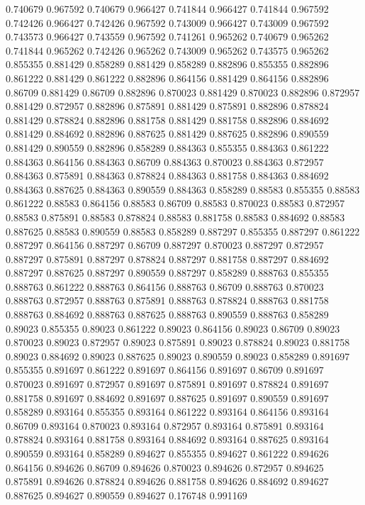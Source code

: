 0.740679 0.967592
0.740679 0.966427
0.741844 0.966427
0.741844 0.967592
0.742426 0.966427
0.742426 0.967592
0.743009 0.966427
0.743009 0.967592
0.743573 0.966427
0.743559 0.967592
0.741261 0.965262
0.740679 0.965262
0.741844 0.965262
0.742426 0.965262
0.743009 0.965262
0.743575 0.965262
0.855355 0.881429
0.858289 0.881429
0.858289 0.882896
0.855355 0.882896
0.861222 0.881429
0.861222 0.882896
0.864156 0.881429
0.864156 0.882896
0.86709 0.881429
0.86709 0.882896
0.870023 0.881429
0.870023 0.882896
0.872957 0.881429
0.872957 0.882896
0.875891 0.881429
0.875891 0.882896
0.878824 0.881429
0.878824 0.882896
0.881758 0.881429
0.881758 0.882896
0.884692 0.881429
0.884692 0.882896
0.887625 0.881429
0.887625 0.882896
0.890559 0.881429
0.890559 0.882896
0.858289 0.884363
0.855355 0.884363
0.861222 0.884363
0.864156 0.884363
0.86709 0.884363
0.870023 0.884363
0.872957 0.884363
0.875891 0.884363
0.878824 0.884363
0.881758 0.884363
0.884692 0.884363
0.887625 0.884363
0.890559 0.884363
0.858289 0.88583
0.855355 0.88583
0.861222 0.88583
0.864156 0.88583
0.86709 0.88583
0.870023 0.88583
0.872957 0.88583
0.875891 0.88583
0.878824 0.88583
0.881758 0.88583
0.884692 0.88583
0.887625 0.88583
0.890559 0.88583
0.858289 0.887297
0.855355 0.887297
0.861222 0.887297
0.864156 0.887297
0.86709 0.887297
0.870023 0.887297
0.872957 0.887297
0.875891 0.887297
0.878824 0.887297
0.881758 0.887297
0.884692 0.887297
0.887625 0.887297
0.890559 0.887297
0.858289 0.888763
0.855355 0.888763
0.861222 0.888763
0.864156 0.888763
0.86709 0.888763
0.870023 0.888763
0.872957 0.888763
0.875891 0.888763
0.878824 0.888763
0.881758 0.888763
0.884692 0.888763
0.887625 0.888763
0.890559 0.888763
0.858289 0.89023
0.855355 0.89023
0.861222 0.89023
0.864156 0.89023
0.86709 0.89023
0.870023 0.89023
0.872957 0.89023
0.875891 0.89023
0.878824 0.89023
0.881758 0.89023
0.884692 0.89023
0.887625 0.89023
0.890559 0.89023
0.858289 0.891697
0.855355 0.891697
0.861222 0.891697
0.864156 0.891697
0.86709 0.891697
0.870023 0.891697
0.872957 0.891697
0.875891 0.891697
0.878824 0.891697
0.881758 0.891697
0.884692 0.891697
0.887625 0.891697
0.890559 0.891697
0.858289 0.893164
0.855355 0.893164
0.861222 0.893164
0.864156 0.893164
0.86709 0.893164
0.870023 0.893164
0.872957 0.893164
0.875891 0.893164
0.878824 0.893164
0.881758 0.893164
0.884692 0.893164
0.887625 0.893164
0.890559 0.893164
0.858289 0.894627
0.855355 0.894627
0.861222 0.894626
0.864156 0.894626
0.86709 0.894626
0.870023 0.894626
0.872957 0.894625
0.875891 0.894626
0.878824 0.894626
0.881758 0.894626
0.884692 0.894627
0.887625 0.894627
0.890559 0.894627
0.176748 0.991169
